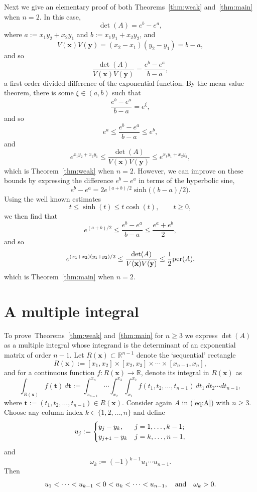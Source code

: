 \documentclass[12pt]{article}
\newcommand{\RR}{\mathbb{R}}
\def\bft{\mathbf{t}}
\def\bfx{\mathbf{x}}
\def\bfy{\mathbf{y}}
\def\per{{\rm per}}
\begin{document}
Next we give an elementary proof of both
Theorems~\ref{thm:weak} and~\ref{thm:main} when $n=2$. In this case,
$$ \det(A) = e^b - e^a, $$
where $a := x_1 y_2 + x_2 y_1$ and $b := x_1 y_1 + x_2 y_2$,
and
$$ V(\bfx)V(\bfy) = (x_2-x_1)(y_2-y_1) = b-a, $$
and so
$$ \frac{\det(A)}{V(\bfx)V(\bfy)}
   = \frac{e^b - e^a}{b-a}, $$
a first order divided difference of the exponential function.
By the mean value theorem, there is some $\xi \in (a,b)$
such that
$$ \frac{e^b - e^a}{b-a} = e^\xi, $$
and so
$$ e^a \le \frac{e^b - e^a}{b-a} \le e^b, $$
and
$$ e^{x_1y_2+x_2y_1} \le \frac{\det(A)}{V(\bfx)V(\bfy)}
 \le e^{x_1y_1+x_2y_2}, $$
which is Theorem~\ref{thm:weak} when $n=2$.
However, we can improve on these bounds by expressing
the difference $e^b-e^a$ in terms of the hyperbolic sine,
$$ e^b - e^a = 2 e^{(a+b)/2} \sinh\big((b-a)/2\big). $$
Using the well known estimates
$$ t \le \sinh(t) \le t \cosh(t), \qquad t \ge 0, $$
we then find that
$$ e^{(a+b)/2} \le \frac{e^b - e^a}{b-a} \le \frac{e^a + e^b}{2}, $$
and so
$$ e^{(x_1+x_2)(y_1+y_2)/2} \le
   \frac{\det(A)}{V(\bfx)V(\bfy)} \le \frac{1}{2} \per(A), $$
which is Theorem~\ref{thm:main} when $n=2$.

\section{A multiple integral}
To prove~Theorems~\ref{thm:weak} and~\ref{thm:main}
for $n \ge 3$ we express $\det(A)$ as a multiple integral
whose integrand is the determinant of an exponential
matrix of order $n-1$.
Let $R(\bfx) \subset \RR^{n-1}$ denote the `sequential' rectangle
\begin{equation}\label{eq:sequential}
 R(\bfx) := 
[x_1,x_2] \times [x_2,x_3] \times \cdots \times [x_{n-1},x_n],
\end{equation}
and for a continuous function $f:R(\bfx) \to \RR$, denote
its integral in $R(\bfx)$ as
$$ \int_{R(\bfx)} f(\bft) \, d \bft
 := 
\int_{x_{n-1}}^{x_n} \cdots
\int_{x_2}^{x_3}
\int_{x_1}^{x_2} f(t_1,t_2,\ldots,t_{n-1}) \, dt_1 \, dt_2 \cdots dt_{n-1},
$$
where $\bft := (t_1,t_2,\ldots,t_{n-1}) \in R(\bfx)$.
Consider again $A$ in (\ref{eq:A}) with $n \ge 3$.
Choose any column index $k \in \{1,2,\ldots,n\}$ and define
\begin{equation}\label{eq:uj}
u_j := \begin{cases} y_j-y_k, & j=1,\ldots,k-1; \cr
                       y_{j+1}-y_k & j=k,\ldots,n-1, \cr
\end{cases}
\end{equation}
and
\begin{equation}\label{eq:pk}
 \omega_k := (-1)^{k-1} u_1 \cdots u_{n-1}.
\end{equation}
Then
$$ u_1 < \cdots < u_{k-1} < 0 < u_k < \cdots < u_{n-1}, 
\quad\hbox{and} \quad \omega_k > 0. $$
\end{document}
